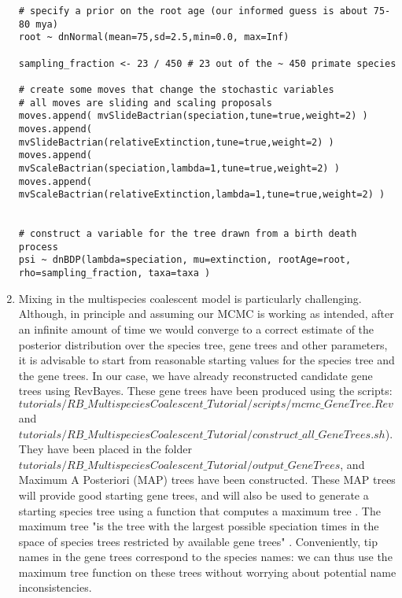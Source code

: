 \begin{enumerate}
{\begin{snugshade*}
\begin{lstlisting}
# specify a prior on the root age (our informed guess is about 75-80 mya)
root ~ dnNormal(mean=75,sd=2.5,min=0.0, max=Inf)

sampling_fraction <- 23 / 450 # 23 out of the ~ 450 primate species

# create some moves that change the stochastic variables
# all moves are sliding and scaling proposals
moves.append( mvSlideBactrian(speciation,tune=true,weight=2) )
moves.append( mvSlideBactrian(relativeExtinction,tune=true,weight=2) )
moves.append( mvScaleBactrian(speciation,lambda=1,tune=true,weight=2) )
moves.append( mvScaleBactrian(relativeExtinction,lambda=1,tune=true,weight=2) )


# construct a variable for the tree drawn from a birth death process
psi ~ dnBDP(lambda=speciation, mu=extinction, rootAge=root, rho=sampling_fraction, taxa=taxa )

\end{lstlisting}
\end{snugshade*}}

\item Mixing in the multispecies coalescent model is particularly challenging. 
Although, in principle and assuming our MCMC is working as intended, after an infinite amount of time we would converge to a correct estimate of the posterior distribution over the species tree, gene trees and other parameters, it is advisable to start from reasonable starting values for the species tree and the gene trees.
In our case, we have already reconstructed candidate gene trees using RevBayes.
These gene trees have been produced using the scripts: \\ {\footnotesize \emph{$tutorials/RB\_MultispeciesCoalescent\_Tutorial/scripts/mcmc\_GeneTree.Rev$}} and \\ {\footnotesize \emph{$tutorials/RB\_MultispeciesCoalescent\_Tutorial/construct\_all\_GeneTrees.sh$}}).
They have been placed in the folder {\footnotesize \emph{$tutorials/RB\_MultispeciesCoalescent\_Tutorial/output\_GeneTrees$}}, and Maximum A Posteriori (MAP) trees have been constructed.
These MAP trees will provide good starting gene trees, and will also be used to generate a starting species tree using a function that computes a maximum tree \citep{Edwards2007}.
The maximum tree "is the tree with the largest possible speciation times in the space of species trees restricted by available gene trees" \citep{Liu2010}.
Conveniently, tip names in the gene trees correspond to the species names: we can thus use the maximum tree function on these trees without worrying about potential name inconsistencies.


\end{enumerate}
